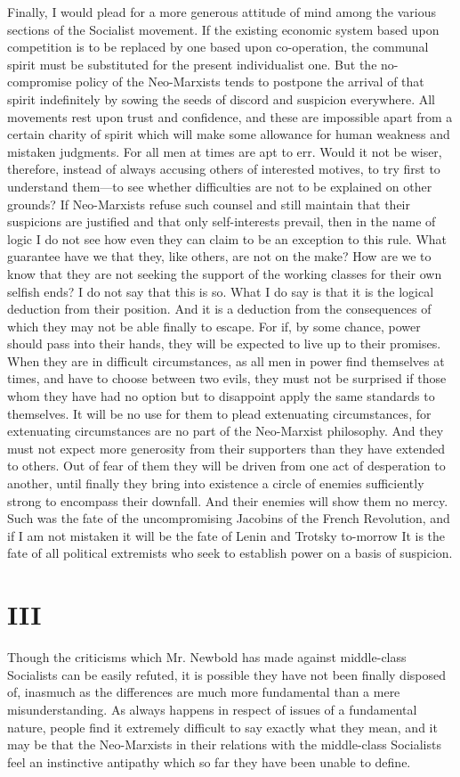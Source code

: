 \documentclass{book}
\begin{document}
Finally, I would plead for a more generous attitude of mind among the various sections of the Socialist movement. If the existing economic system based upon competition is to be replaced by one based upon co-operation, the communal spirit must be substituted for the present individualist one. But the no-compromise policy of the Neo-Marxists tends to postpone the arrival of that spirit indefinitely by sowing the seeds of discord and suspicion everywhere. All movements rest upon trust and confidence, and these are impossible apart from a certain charity of spirit which will make some allowance for human weakness and mistaken judgments. For all men at times are apt to err. Would it not be wiser, therefore, instead of always accusing others of interested motives, to try first to understand them—to see whether difficulties are not to be explained on other grounds? If Neo-Marxists refuse such counsel and still maintain that their suspicions are justified and that only self-interests prevail, then in the name of logic I do not see how even they can claim to be an exception to this rule. What guarantee have we that they, like others, are not on the make? How are we to know that they are not seeking the support of the working classes for their own selfish ends? I do not say that this is so. What I do say is that it is the logical deduction from their position. And it is a deduction from the consequences of which they may not be able finally to escape. For if, by some chance, power should pass into their hands, they will be expected to live up to their promises. When they are in difficult circumstances, as all men in power find themselves at times, and have to choose between two evils, they must not be surprised if those whom they have had no option but to disappoint apply the same standards to themselves. It will be no use for them to plead extenuating circumstances, for extenuating circumstances are no part of the Neo-Marxist philosophy. And they must not expect more generosity from their supporters than they have extended to others. Out of fear of them they will be driven from one act of desperation to another, until finally they bring into existence a circle of enemies sufficiently strong to encompass their downfall. And their enemies will show them no mercy. Such was the fate of the uncompromising Jacobins of the French Revolution, and if I am not mistaken it will be the fate of Lenin and Trotsky to-morrow It is the fate of all political extremists who seek to establish power on a basis of suspicion.

\section{III}
Though the criticisms which Mr. Newbold has made against middle-class Socialists can be easily refuted, it is possible they have not been finally disposed of, inasmuch as the differences are much more fundamental than a mere misunderstanding. As always happens in respect of issues of a fundamental nature, people find it extremely difficult to say exactly what they mean, and it may be that the Neo-Marxists in their relations with the middle-class Socialists feel an instinctive antipathy which so far they have been unable to define.
\end{document}

